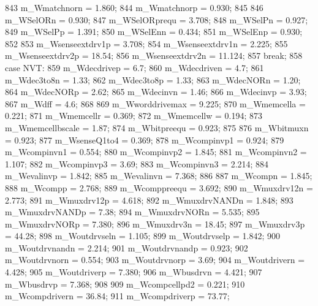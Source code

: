 \begin{DoxyCode}
{{{843                 m_Wmatchnorn = 1.860;
844                 m_Wmatchnorp = 0.930;
845 
846                 m_WSelORn = 0.930;
847                 m_WSelORprequ = 3.708;
848                 m_WSelPn = 0.927;
849                 m_WSelPp = 1.391;
850                 m_WSelEnn = 0.434;
851                 m_WSelEnp = 0.930;
852 
853                 m_Wsenseextdrv1p = 3.708;
854                 m_Wsenseextdrv1n = 2.225;
855                 m_Wsenseextdrv2p = 18.54;
856                 m_Wsenseextdrv2n = 11.124;
857                 break;
858             case NVT:
859                 m_Wdecdrivep = 6.7;
860                 m_Wdecdriven = 4.7;
861                 m_Wdec3to8n = 1.33;
862                 m_Wdec3to8p = 1.33;
863                 m_WdecNORn = 1.20;
864                 m_WdecNORp = 2.62;
865                 m_Wdecinvn = 1.46;
866                 m_Wdecinvp = 3.93;
867                 m_Wdff = 4.6;
868 
869                 m_Wworddrivemax = 9.225;
870                 m_Wmemcella = 0.221;
871                 m_Wmemcellr = 0.369;
872                 m_Wmemcellw = 0.194;
873                 m_Wmemcellbscale = 1.87;
874                 m_Wbitpreequ = 0.923;
875 
876                 m_Wbitmuxn = 0.923;
877                 m_WsenseQ1to4 = 0.369;
878                 m_Wcompinvp1 = 0.924;
879                 m_Wcompinvn1 = 0.554;
880                 m_Wcompinvp2 = 1.845;
881                 m_Wcompinvn2 = 1.107;
882                 m_Wcompinvp3 = 3.69;
883                 m_Wcompinvn3 = 2.214;
884                 m_Wevalinvp = 1.842;
885                 m_Wevalinvn = 7.368;
886 
887                 m_Wcompn = 1.845;
888                 m_Wcompp = 2.768;
889                 m_Wcomppreequ = 3.692;
890                 m_Wmuxdrv12n = 2.773;
891                 m_Wmuxdrv12p = 4.618;
892                 m_WmuxdrvNANDn = 1.848;
893                 m_WmuxdrvNANDp = 7.38;
894                 m_WmuxdrvNORn = 5.535;
895                 m_WmuxdrvNORp = 7.380;
896                 m_Wmuxdrv3n = 18.45;
897                 m_Wmuxdrv3p = 44.28;
898                 m_Woutdrvseln = 1.105;
899                 m_Woutdrvselp = 1.842;
900                 m_Woutdrvnandn = 2.214;
901                 m_Woutdrvnandp = 0.923;
902                 m_Woutdrvnorn = 0.554;
903                 m_Woutdrvnorp = 3.69;
904                 m_Woutdrivern = 4.428;
905                 m_Woutdriverp = 7.380;
906                 m_Wbusdrvn = 4.421;
907                 m_Wbusdrvp = 7.368;
908 
909                 m_Wcompcellpd2 = 0.221;
910                 m_Wcompdrivern = 36.84;
911                 m_Wcompdriverp = 73.77;
}}}
\end{DoxyCode}
